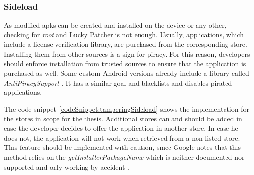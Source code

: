 \subsubsection{Sideload} \label{subsection:counter-improve-tampering-sideload}
As modified \gls{apk}s can be created and installed on the device or any other, checking for \textit{root} and Lucky Patcher is not enough.
Usually, applications, which include a license verification library, are purchased from the corresponding store.
Installing them from other sources is a sign for piracy.
For this reason, developers should enforce installation from trusted sources to ensure that the application is purchased as well.
Some custom Android versions already include a library called \textit{AntiPiracySupport} \cite{antipiracy}.
It has a similar goal and blacklists and disables pirated applications.
\newline

The code snippet~\ref{codeSnippet:tamperingSideload} shows the implementation for the stores in scope for the thesis.
Additional stores can and should be added in case the developer decides to offer the application in another store.
In case he does not, the application will not work when retrieved from a non listed store.
\newline
This feature should be implemented with caution, since Google notes that this method relies on the \textit{getInstallerPackageName} which is neither documented nor supported and only working by accident \cite{developersSecuring}.

